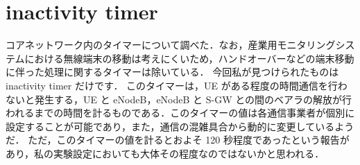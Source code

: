 \documentclass[a4j]{jarticle}
\begin{document}
\section{inactivity timer}
コアネットワーク内のタイマーについて調べた．なお，産業用モニタリングシステムにおける無線端末の移動は考えにくいため，ハンドオーバーなどの端末移動に伴った処理に関するタイマーは除いている．
今回私が見つけられたものは inactivity timer だけです．
このタイマーは，UE がある程度の時間通信を行わないと発生する，UE と eNodeB，eNodeB と S-GW との間のベアラの解放が行われるまでの時間を計るものである．このタイマーの値は各通信事業者が個別に設定することが可能であり，また，通信の混雑具合から動的に変更しているようだ\cite{chen2015analysis}．
ただ，このタイマーの値を計るとおよそ 120 秒程度であったという報告\cite{1}があり，私の実験設定においても大体その程度なのではないかと思われる．


\end{document}
